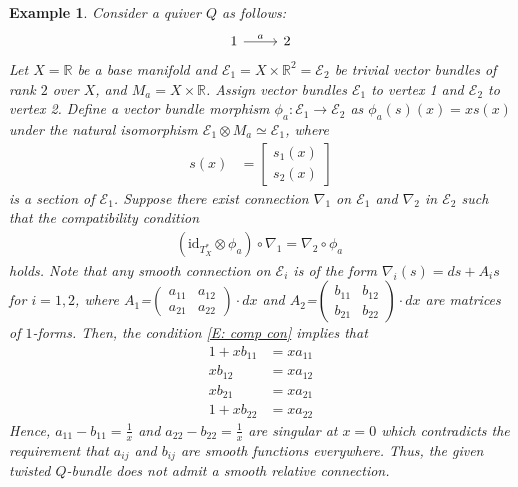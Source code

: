 \documentclass[12pt, reqno]{amsart}
\theoremstyle{plain}
\newtheorem{example}[theorem]{Example}
\numberwithin{equation}{section}
\newcommand{\E}{\mathcal{E}}
\begin{document}
\begin{example}\label{Ex: Non exist}
		\rm   Consider a quiver $Q$ as follows:
		\[
		\begin{tikzcd}
			1 \arrow[r,"a"] & 2
		\end{tikzcd}
		\]
		Let $X= \mathbb{R}$ be a base manifold and $\mathcal{E}_{1}= X \times \mathbb{R}^{2}=\mathcal{E}_{2}$ be trivial vector bundles of rank $2$ over $X$, and $M_a = X \times \mathbb{R}$. Assign vector bundles $\mathcal{E}_{1}$ to vertex 1 and $\mathcal{E}_{2}$ to vertex 2. Define a vector bundle morphism $\phi_{a}: \mathcal{E}_{1} \rightarrow \mathcal{E}_{2}$ as $\phi_{a}(s)(x)= x s(x)$ under the natural isomorphism $\mathcal{E}_1 \otimes M_a \simeq \E_1$, where 
		\begin{align*}
			s(x) &= \begin{bmatrix}
				s_{1}(x) \\
				s_{2}(x) 
			\end{bmatrix}
		\end{align*}
		is a section of $\mathcal{E}_{1}$. Suppose there exist connection $\nabla_{1}$ on $\E_1$ and $\nabla_{2}$ in $\E_2$ such that the compatibility condition 
		\begin{align}\label{E: comp con}
		(\mathrm{id}_{T^*_X} \otimes \phi_a)	\circ \nabla_{1} = \nabla_{2} \circ \phi_{a}\
		\end{align}
		 holds. Note that any smooth connection on $\E_i$ is of the form $\nabla_{i}(s)= ds+ A_{i}s$ for $i=1,2$, where 
		$A_{1}$=$\begin{pmatrix}
			a_{11} & a_{12}\\
			a_{21} & a_{22}
		\end{pmatrix} \cdot dx$ and $A_{2}$=$\begin{pmatrix}
			b_{11} & b_{12}\\
			b_{21} & b_{22}
		\end{pmatrix} \cdot dx$
		are matrices of $1$-forms. Then, the condition \eqref{E: comp con} implies that 
		\begin{equation*}
			\begin{split}
				1+xb_{11} &=xa_{11}\\
				xb_{12}&=xa_{12}\\
				xb_{21}&=xa_{21}\\
				1+xb_{22} &=xa_{22}
			\end{split}
		\end{equation*}
	Hence, $a_{11}-b_{11}=\frac{1}{x}$ and $a_{22}-b_{22}=\frac{1}{x}$ are singular at $x=0$ which contradicts the requirement that $a_{ij}$ and $b_{ij}$ are smooth functions everywhere. Thus, the given twisted $Q$-bundle does not admit a smooth relative connection.
\end{example}
\end{document}
